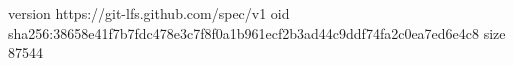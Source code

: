 version https://git-lfs.github.com/spec/v1
oid sha256:38658e41f7b7fdc478e3c7f8f0a1b961ecf2b3ad44c9ddf74fa2c0ea7ed6e4c8
size 87544
